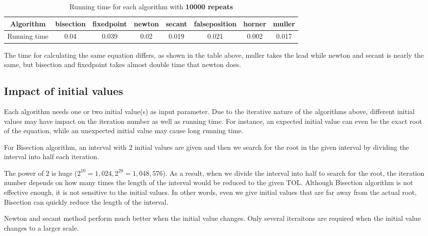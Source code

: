 \documentclass{article}
\begin{document}
\begin{table}[htbp]
    \centering
    \caption{Running time for each algorithm with \textbf{10000 repeats}}
      \begin{tabular}{cccccccc}
      \toprule
      \toprule
      Algorithm & bisection & fixedpoint & newton & secant & falseposition & horner & muller \\
      \midrule
      Running time & 0.04  & 0.039 & 0.02  & 0.019 & 0.021 & 0.002 & 0.017 \\
      \bottomrule
      \end{tabular}%
    \label{t1}%
  \end{table}%
  
The time for calculating the same equation differs, as shown in the table above, muller takes the lead while newton and secant is nearly the same, but bisection and fixedpoint takes almost double time that newton does.

\subsection{Impact of initial values}

    Each algorithm needs one or two initial value(s) as input parameter. Due to the iterative nature of the algorithms above, different initial values may have impact on the iteration number as well as running time. For instance, an expected initial value can even be the exact root of the equation, while an unexpected initial value may cause long running time.

        For Bisection algorithm, an interval with 2 initial values are given and then we search for the root in the given interval by dividing the interval into half each iteration. 
        
        The power of 2 is huge ($2^{10} = 1,024, 2^{20} = 1,048,576$). As a result, when we divide the interval into half to search for the root, the iteration number depends on how many times the length of the interval would be reduced to the given TOL. Although Bisection algorithm is not effective enough, it is not sensitive to the initial values. In other words, even we give initial values that are far away from the actual root, Bisection can quickly reduce the length of the interval.

        Newton and secant method perform much better when the initial value changes. Only several iteraitons are required when the initial value changes to a larger scale. 
\end{document}

